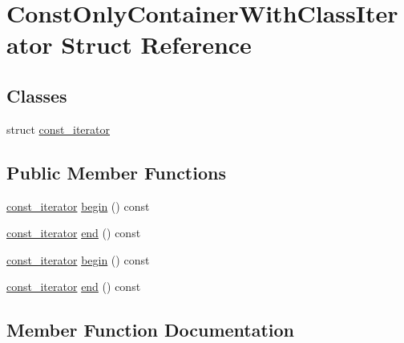 \hypertarget{struct_const_only_container_with_class_iterator}{}\section{Const\+Only\+Container\+With\+Class\+Iterator Struct Reference}
\label{struct_const_only_container_with_class_iterator}
\subsection*{Classes}
\begin{DoxyCompactItemize}
\item 
struct \mbox{\hyperlink{struct_const_only_container_with_class_iterator_1_1const__iterator}{const\+\_\+iterator}}
\end{DoxyCompactItemize}
\subsection*{Public Member Functions}
\begin{DoxyCompactItemize}
\item 
\mbox{\hyperlink{struct_const_only_container_with_class_iterator_1_1const__iterator}{const\+\_\+iterator}} \mbox{\hyperlink{struct_const_only_container_with_class_iterator_a30be5262acd17c34d19b19d560ebd541}{begin}} () const
\item 
\mbox{\hyperlink{struct_const_only_container_with_class_iterator_1_1const__iterator}{const\+\_\+iterator}} \mbox{\hyperlink{struct_const_only_container_with_class_iterator_a3d6e17f17eecd7b1ef02afc9a75a0bde}{end}} () const
\item 
\mbox{\hyperlink{struct_const_only_container_with_class_iterator_1_1const__iterator}{const\+\_\+iterator}} \mbox{\hyperlink{struct_const_only_container_with_class_iterator_a30be5262acd17c34d19b19d560ebd541}{begin}} () const
\item 
\mbox{\hyperlink{struct_const_only_container_with_class_iterator_1_1const__iterator}{const\+\_\+iterator}} \mbox{\hyperlink{struct_const_only_container_with_class_iterator_a3d6e17f17eecd7b1ef02afc9a75a0bde}{end}} () const
\end{DoxyCompactItemize}


\subsection{Member Function Documentation}
\mbox{\label{struct_const_only_container_with_class_iterator_a30be5262acd17c34d19b19d560ebd541}} 
